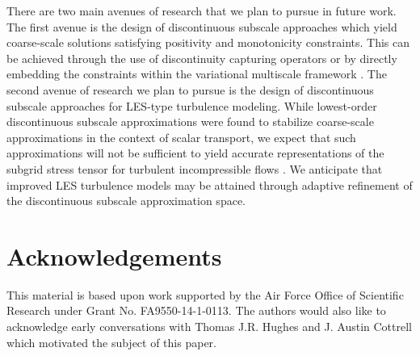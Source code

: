 \documentclass[11pt]{article}
\begin{document}
There are two main avenues of research that we plan to pursue in future work.  The first avenue is the design of discontinuous subscale approaches which yield coarse-scale solutions satisfying positivity and monotonicity constraints.  This can be achieved through the use of discontinuity capturing operators \cite{John07,John08} or by directly embedding the constraints within the variational multiscale framework \cite{Evans09}.  The second avenue of research we plan to pursue is the design of discontinuous subscale approaches for LES-type turbulence modeling. While lowest-order discontinuous subscale approximations were found to stabilize coarse-scale approximations in the context of scalar transport, we expect that such approximations will not be sufficient to yield accurate representations of the subgrid stress tensor for turbulent incompressible flows \cite{Wang10}.  We anticipate that improved LES turbulence models may be attained through adaptive refinement of the discontinuous subscale approximation space.

\section*{Acknowledgements}

This material is based upon work supported by the Air Force Office of Scientific Research under Grant No. FA9550-14-1-0113.  The authors would also like to acknowledge early conversations with Thomas J.R. Hughes and J. Austin Cottrell which motivated the subject of this paper.



\end{document}
